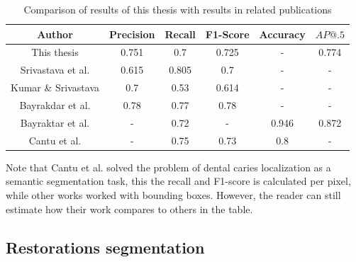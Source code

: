 \begin{table}
    \centering
    \begin{tabular}{|c|c|c|c|c|c|}
        \hline
        Author                                                                 & Precision & Recall & F1-Score & Accuracy & $AP@.5$ \\ \hline
        This thesis                                                            & 0.751     & 0.7    & 0.725    & -        & 0.774   \\ \hline
        Srivastava et al. \cite{Srivastava2017}                                & 0.615     & 0.805  & 0.7      & -        & -       \\ \hline
        Kumar                                   \& Srivastava \cite{Kumar2018} & 0.7       & 0.53   & 0.614    & -        & -       \\ \hline
        Bayrakdar et al. \cite{Bayrakdar2021}                                  & 0.78      & 0.77   & 0.78     & -        & -       \\ \hline
        Bayraktar et al. \cite{Bayraktar2021}                                  & -         & 0.72   & -        & 0.946    & 0.872   \\ \hline
        Cantu et al. \cite{Cantu2020}                                          & -         & 0.75   & 0.73     & 0.8      & -       \\ \hline
    \end{tabular}
    \caption{Comparison of results of this thesis with results in related publications}
    \label{tab:results_comparison}
\end{table}

Note that Cantu et al. \cite{Cantu2020} solved the problem of dental caries localization as a semantic segmentation task, this the recall and F1-score is calculated per pixel, while other works worked with bounding boxes. However, the reader can still estimate how their work compares to others in the table.

\subsection{Restorations segmentation}